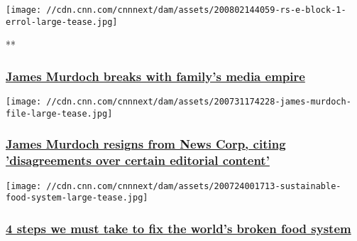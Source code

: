 \href{/videos/business/2020/08/02/james-murdoch-breaks-with-familys-media-empire.cnn}{}

\texttt{[image: //cdn.cnn.com/cnnnext/dam/assets/200802144059-rs-e-block-1-errol-large-tease.jpg]}

**

\hypertarget{james-murdoch-breaks-with-familys-media-empire}{%
\subsubsection{\texorpdfstring{\href{/videos/business/2020/08/02/james-murdoch-breaks-with-familys-media-empire.cnn}{James
Murdoch breaks with family's media
empire}}{James Murdoch breaks with family's media empire}}\label{james-murdoch-breaks-with-familys-media-empire}}

\href{/2020/07/31/media/james-murdoch-resigns-news-corp/index.html}{}

\texttt{[image: //cdn.cnn.com/cnnnext/dam/assets/200731174228-james-murdoch-file-large-tease.jpg]}

\hypertarget{james-murdoch-resigns-from-news-corp-citing-disagreements-over-certain-editorial-content}{%
\subsubsection{\texorpdfstring{\href{/2020/07/31/media/james-murdoch-resigns-news-corp/index.html}{James
Murdoch resigns from News Corp, citing 'disagreements over certain
editorial
content'}}{James Murdoch resigns from News Corp, citing 'disagreements over certain editorial content'}}\label{james-murdoch-resigns-from-news-corp-citing-disagreements-over-certain-editorial-content}}

\href{/2020/07/31/perspectives/sustainable-food-systems-imf/index.html}{}

\texttt{[image: //cdn.cnn.com/cnnnext/dam/assets/200724001713-sustainable-food-system-large-tease.jpg]}

\hypertarget{4-steps-we-must-take-to-fix-the-worlds-broken-food-system}{%
\subsubsection{\texorpdfstring{\href{/2020/07/31/perspectives/sustainable-food-systems-imf/index.html}{4
steps we must take to fix the world's broken food
system}}{4 steps we must take to fix the world's broken food system}}\label{4-steps-we-must-take-to-fix-the-worlds-broken-food-system}}

